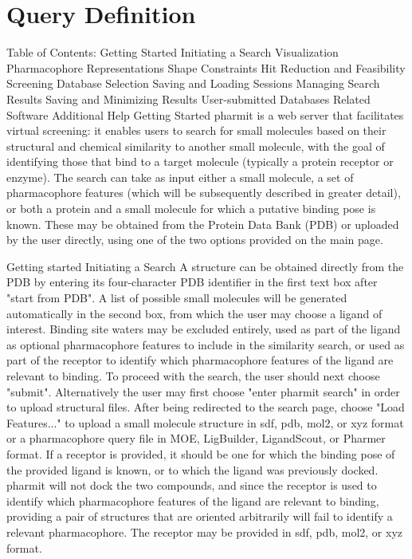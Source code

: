 \section{Query Definition}

Table of Contents:
Getting Started
Initiating a Search
Visualization
Pharmacophore Representations
Shape Constraints
Hit Reduction and Feasibility Screening
Database Selection
Saving and Loading Sessions
Managing Search Results
Saving and Minimizing Results
User-submitted Databases
Related Software
Additional Help
Getting Started
pharmit is a web server that facilitates virtual screening: it enables users to search for small molecules based on their structural and chemical similarity to another small molecule, with the goal of identifying those that bind to a target molecule (typically a protein receptor or enzyme). The search can take as input either a small molecule, a set of pharmacophore features (which will be subsequently described in greater detail), or both a protein and a small molecule for which a putative binding pose is known. These may be obtained from the Protein Data Bank (PDB) or uploaded by the user directly, using one of the two options provided on the main page.


Getting started
Initiating a Search
A structure can be obtained directly from the PDB by entering its four-character PDB identifier in the first text box after "start from PDB". A list of possible small molecules will be generated automatically in the second box, from which the user may choose a ligand of interest. Binding site waters may be excluded entirely, used as part of the ligand as optional pharmacophore features to include in the similarity search, or used as part of the receptor to identify which pharmacophore features of the ligand are relevant to binding. To proceed with the search, the user should next choose "submit". 
Alternatively the user may first choose "enter pharmit search" in order to upload structural files. After being redirected to the search page, choose "Load Features..." to upload a small molecule structure in sdf, pdb, mol2, or xyz format or a pharmacophore query file in MOE, LigBuilder, LigandScout, or Pharmer format. If a receptor is provided, it should be one for which the binding pose of the provided ligand is known, or to which the ligand was previously docked. pharmit will not dock the two compounds, and since the receptor is used to identify which pharmacophore features of the ligand are relevant to binding, providing a pair of structures that are oriented arbitrarily will fail to identify a relevant pharmacophore. The receptor may be provided in sdf, pdb, mol2, or xyz format.


